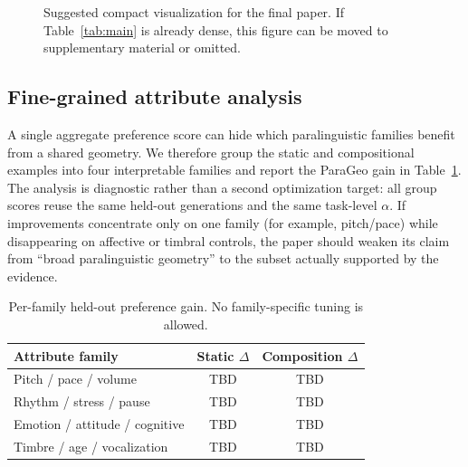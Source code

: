 \documentclass{article}
\begin{document}
\begin{figure}[t]
\centering
{}
\caption{Suggested compact visualization for the final paper. If Table~\ref{tab:main} is already dense, this figure can be moved to supplementary material or omitted.}
\label{fig:results}
\end{figure}

\subsection{Fine-grained attribute analysis}
A single aggregate preference score can hide which paralinguistic families benefit from a shared geometry. We therefore group the static and compositional examples into four interpretable families and report the ParaGeo gain in Table~\ref{tab:groups}. The analysis is diagnostic rather than a second optimization target: all group scores reuse the same held-out generations and the same task-level $\alpha$. If improvements concentrate only on one family (for example, pitch/pace) while disappearing on affective or timbral controls, the paper should weaken its claim from ``broad paralinguistic geometry'' to the subset actually supported by the evidence.

\begin{table}[t]
\centering
\caption{Per-family held-out preference gain. No family-specific tuning is allowed.}
\label{tab:groups}
\setlength{\tabcolsep}{3.4pt}
\begin{tabular}{lcc}
\toprule
Attribute family & Static $\Delta$ & Composition $\Delta$ \\
\midrule
Pitch / pace / volume & TBD & TBD \\
Rhythm / stress / pause & TBD & TBD \\
Emotion / attitude / cognitive & TBD & TBD \\
Timbre / age / vocalization & TBD & TBD \\
\bottomrule
\end{tabular}
\end{table}
\end{document}
